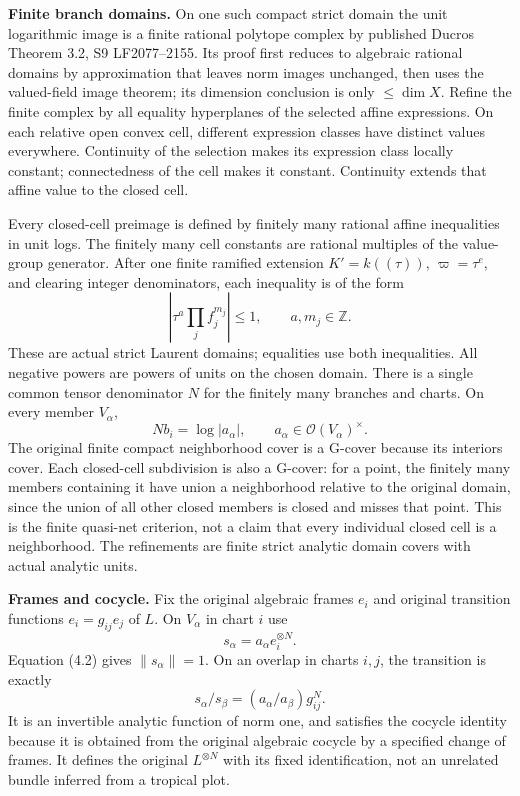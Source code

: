 \documentclass[
  10pt,
]{article}
\begin{document}
\textbf{Finite branch domains.} On one such compact strict domain the
unit logarithmic image is a finite rational polytope complex by
published Ducros Theorem 3.2, S9 LF2077--2155. Its proof first reduces
to algebraic rational domains by approximation that leaves norm images
unchanged, then uses the valued-field image theorem; its dimension
conclusion is only \(\le\dim X\). Refine the finite complex by all
equality hyperplanes of the selected affine expressions. On each
relative open convex cell, different expression classes have distinct
values everywhere. Continuity of the selection makes its expression
class locally constant; connectedness of the cell makes it constant.
Continuity extends that affine value to the closed cell.

Every closed-cell preimage is defined by finitely many rational affine
inequalities in unit logs. The finitely many cell constants are rational
multiples of the value-group generator. After one finite ramified
extension \(K'=k((\tau))\), \(\varpi=\tau^e\), and clearing integer
denominators, each inequality is of the form
\[|\tau^a\prod_j f_j^{m_j}|\le1,\qquad a,m_j\in\mathbb Z.\tag{4.1}\]
These are actual strict Laurent domains; equalities use both
inequalities. All negative powers are powers of units on the chosen
domain. There is a single common tensor denominator \(N\) for the
finitely many branches and charts. On every member \(V_\alpha\),
\[Nb_i=\log|a_\alpha|,\qquad a_\alpha\in\mathcal O(V_\alpha)^\times.\tag{4.2}\]
The original finite compact neighborhood cover is a G-cover because its
interiors cover. Each closed-cell subdivision is also a G-cover: for a
point, the finitely many members containing it have union a neighborhood
relative to the original domain, since the union of all other closed
members is closed and misses that point. This is the finite quasi-net
criterion, not a claim that every individual closed cell is a
neighborhood. The refinements are finite strict analytic domain covers
with actual analytic units.

\textbf{Frames and cocycle.} Fix the original algebraic frames \(e_i\)
and original transition functions \(e_i=g_{ij}e_j\) of \(L\). On
\(V_\alpha\) in chart \(i\) use \[s_\alpha=a_\alpha e_i^{\otimes N}.\]
Equation (4.2) gives \(\|s_\alpha\|=1\). On an overlap in charts
\(i,j\), the transition is exactly
\[s_\alpha/s_\beta=(a_\alpha/a_\beta)g_{ij}^{N}.\tag{4.3}\] It is an
invertible analytic function of norm one, and satisfies the cocycle
identity because it is obtained from the original algebraic cocycle by a
specified change of frames. It defines the original \(L^{\otimes N}\)
with its fixed identification, not an unrelated bundle inferred from a
tropical plot.
\end{document}
